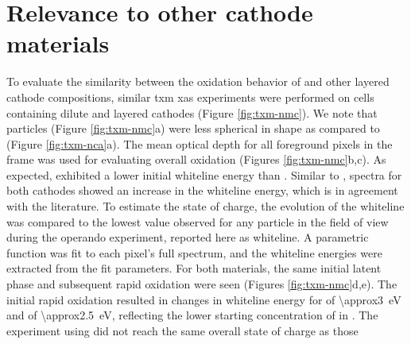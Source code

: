 \documentclass{article}
\begin{document}
\newpage %
\section{Relevance to other cathode materials}


To evaluate the similarity between the oxidation behavior of \nca{}
and other layered cathode compositions, similar \gls{txm} \gls{xas}
experiments were performed on cells containing dilute \nmc[333]{} and
\nmc[532]{} layered cathodes (Figure \ref{fig:txm-nmc}). We note that
\nmc{} particles (Figure \ref{fig:txm-nmc}a) were less spherical in
shape as compared to \nca{} (Figure \ref{fig:txm-nca}a). The mean
optical depth for all foreground pixels in the frame was used for
evaluating overall oxidation (Figures \ref{fig:txm-nmc}b,c). As
expected, \nmc[333]{} exhibited a lower initial whiteline energy than
\nca{}\cite{deb2005,muto2009}. Similar to \nca{}, spectra for both
\nmc{} cathodes showed an increase in the whiteline energy, which is
in agreement with the literature\citeme{}. To estimate the state of
charge, the evolution of the whiteline was compared to the lowest
value observed for any particle in the field of view during the
operando experiment, reported here as \textDelta{}whiteline. A
parametric function was fit to each pixel's full spectrum, and the
whiteline energies were extracted from the fit parameters.  For both \nmc{} materials, the same
initial latent phase and subsequent rapid oxidation were seen (Figures
\ref{fig:txm-nmc}d,e). The initial rapid  oxidation resulted in
changes in whiteline energy for \nmc[333]{} of
\SI{\approx3}{\electronvolt} and \nmc[532]{} of
\SI{\approx2.5}{\electronvolt}, reflecting the lower starting
concentration of  in \nmc[532]{}. The experiment using
\nmc[532]{} did not reach the same overall state of charge as those
\end{document}
